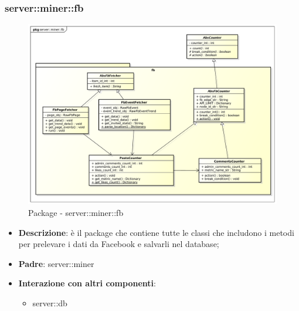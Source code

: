 \subsubsection{server::miner::fb} %
\label{ssub:bdsm_app_server_miner_fb}
\begin{figure}[H]
	\centering
	\centerline{\includegraphics[scale=0.4]{./images/server/miner_fb.pdf}}
	\caption{Package - server::miner::fb}
\end{figure}

\begin{itemize}
  \item \textbf{Descrizione}: è il package che contiene tutte le classi che includono i metodi per prelevare i dati da Facebook e salvarli nel database;
  \item \textbf{Padre}: server::miner
  \item \textbf{Interazione con altri componenti}:
  	\begin{itemize}
  		\item server::db
  	\end{itemize}
\end{itemize}


